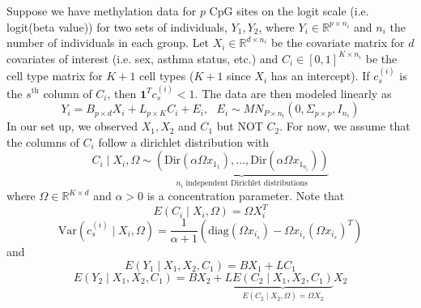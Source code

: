 \documentclass{article}
\begin{document}
Suppose we have methylation data for $p$ CpG sites on the logit scale (i.e. logit(beta value)) for two sets of individuals, $Y_1, Y_2$, where $Y_i \in \mathbb{R}^{p \times n_i}$ and $n_i$ the number of individuals in each group. Let $X_i \in \mathbb{R}^{d \times n_i}$ be the covariate matrix for $d$ covariates of interest (i.e. sex, asthma status, etc.) and $C_i \in [0,1]^{K \times n_i}$ be the cell type matrix for $K+1$ cell types ($K+1$ since $X_i$ has an intercept). If $c_s^{(i)}$ is the $s^{\text{th}}$ column of $C_i$, then $\bm{1}^T c_s^{(i)} < 1$. The data are then modeled linearly as
\[
Y_i = B_{p \times d} X_i + L_{p \times K} C_i + E_i, \text{ } E_i \sim MN_{P \times n_i}\left( 0, \Sigma_{p \times p}, I_{n_i} \right)
\]
In our set up, we observed $X_1, X_2$ and $C_1$ but NOT $C_2$. For now, we assume that the columns of $C_i$ follow a dirichlet distribution with
\[
C_i \mid X_i, \Omega \sim \underbrace{\left( \text{Dir}\left( \alpha\Omega x_{1_1} \right), \ldots, \text{Dir}\left( \alpha\Omega x_{1_{n_i}} \right) \right)}_{\text{$n_i$ independent Dirichlet distributions}}
\]
where $\Omega \in \mathbb{R}^{K \times d}$ and $\alpha > 0$ is a concentration parameter. Note that
\[
E\left( C_i \mid X_i, \Omega \right) = \Omega X_i^T
\]
\[
\text{Var}\left( c_s^{(i)} \mid X_i, \Omega \right) = \frac{1}{\alpha + 1}\left( \text{diag}\left( \Omega x_{i_s} \right) - \Omega x_{i_s} \left( \Omega x_{i_s} \right)^T \right)
\]
and
\[
E\left( Y_1 \mid X_1, X_2, C_1 \right) = BX_1 + LC_1
\]
\[
E\left(  Y_2 \mid X_1, X_2, C_1 \right) = BX_2 + L\underbrace{E\left( C_2 \mid X_1, X_2, C_1 \right)}_{E\left( C_2 \mid X_2, \Omega \right) = \Omega X_2} X_2
\]
\end{document}
